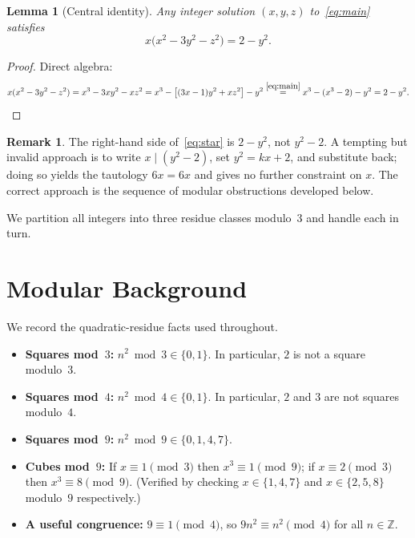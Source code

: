 \documentclass[12pt,a4paper]{article}
\newtheorem{lemma}[theorem]{Lemma}
\theoremstyle{definition}
\newtheorem{remark}[theorem]{Remark}
\newcommand{\Z}{\mathbb{Z}}
\begin{document}
\begin{lemma}[Central identity]\label{lem:rw}
  Any integer solution $(x,y,z)$ to~\eqref{eq:main} satisfies
  \begin{equation}\label{eq:star}
    x\bigl(x^2 - 3y^2 - z^2\bigr) = 2 - y^2. \tag{$*$}
  \end{equation}
\end{lemma}

\begin{proof}
  Direct algebra:
  \[
    x(x^2-3y^2-z^2) = x^3 - 3xy^2 - xz^2
    = x^3 - \bigl[(3x-1)y^2 + xz^2\bigr] - y^2
    \overset{\eqref{eq:main}}{=} x^3 - (x^3-2) - y^2 = 2 - y^2. \qedhere
  \]
\end{proof}

\begin{remark}
  The right-hand side of~\eqref{eq:star} is $2 - y^2$, not $y^2-2$.
  A tempting but invalid approach is to write $x \mid (y^2 - 2)$, set
  $y^2 = kx+2$, and substitute back; doing so yields the tautology $6x=6x$
  and gives no further constraint on $x$.
  The correct approach is the sequence of modular obstructions developed below.
\end{remark}

We partition all integers into three residue classes modulo~$3$ and handle
each in turn.

\section{Modular Background}
\label{sec:background}

We record the quadratic-residue facts used throughout.

\begin{itemize}
  \item \textbf{Squares mod~$3$:} $n^2 \bmod 3 \in \{0,1\}$.
        In particular, $2$ is not a square modulo~$3$.
  \item \textbf{Squares mod~$4$:} $n^2 \bmod 4 \in \{0,1\}$.
        In particular, $2$ and $3$ are not squares modulo~$4$.
  \item \textbf{Squares mod~$9$:} $n^2 \bmod 9 \in \{0,1,4,7\}$.
  \item \textbf{Cubes mod~$9$:}
        If $x \equiv 1 \pmod{3}$ then $x^3 \equiv 1 \pmod{9}$;
        if $x \equiv 2 \pmod{3}$ then $x^3 \equiv 8 \pmod{9}$.
        (Verified by checking $x \in \{1,4,7\}$ and $x \in \{2,5,8\}$
        modulo~$9$ respectively.)
  \item \textbf{A useful congruence:} $9 \equiv 1 \pmod{4}$, so
        $9n^2 \equiv n^2 \pmod{4}$ for all $n\in\Z$.
\end{itemize}
\end{document}
